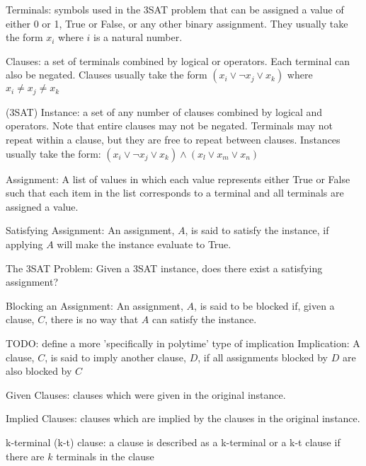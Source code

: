 \documentclass[manuscript]{acmart}
\begin{document}
    \begin{definition}
        Terminals: symbols used in the 3SAT problem that can be assigned a value
        of either 0 or 1, True or False, or any other binary assignment. They usually
        take the form $x_i$ where $i$ is a natural number.
    \end{definition}
    \begin{definition}
        Clauses: a set of terminals combined by logical or operators. Each 
        terminal can also be negated. Clauses usually take the form 
        $(x_i \lor \neg x_j \lor x_k)$ where $x_i \neq x_j \neq x_k$
    \end{definition}
    \begin{definition}
        (3SAT) Instance: a set of any number of clauses combined by logical
        and operators. Note that entire clauses may not be negated. Terminals may
        not repeat within a clause, but they are free to repeat between clauses. 
        Instances usually take the form:
        $(x_i \lor \neg x_j \lor x_k) \land (x_l \lor x_m \lor x_n)$
    \end{definition}
    \begin{definition}
        Assignment: A list of values in which each value represents either True
        or False such that each item in the list corresponds to a terminal and 
        all terminals are assigned a value.
    \end{definition}
    \begin{definition}
        Satisfying Assignment: An assignment, $A$, is said to satisfy the instance, 
        if applying $A$ will make the instance evaluate to True.
    \end{definition}
    \begin{definition}
        The 3SAT Problem: Given a 3SAT instance, does there exist a satisfying assignment?
    \end{definition}
    \begin{definition}
        Blocking an Assignment: An assignment, $A$, is said to be blocked if, given a
        clause, $C$, there is no way that $A$ can satisfy the instance.
    \end{definition}
    \begin{definition}
        TODO: define a more 'specifically in polytime' type of implication
        Implication: A clause, $C$, is said to imply another clause, $D$, if all 
        assignments blocked by $D$ are also blocked by $C$ 
    \end{definition}
    \begin{definition}
        Given Clauses: clauses which were given in the original instance.
    \end{definition}
    \begin{definition}
        Implied Clauses: clauses which are implied by the clauses in the original instance.
    \end{definition}
    \begin{definition}
        k-terminal (k-t) clause: a clause is described as a k-terminal or a k-t clause
        if there are $k$ terminals in the clause
    \end{definition}
\end{document}
